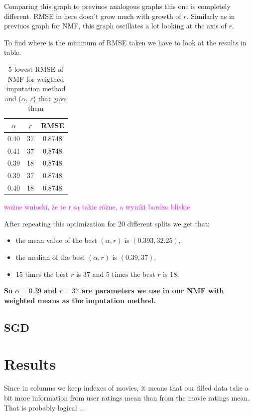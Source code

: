 \documentclass[11pt]{amsart}
\newcommand{\tami}[1]{{\textcolor{magenta}{#1}}}
\begin{document}
Comparing this graph to previuos analogous graphs this one is completely different.
RMSE in here doen't grow much with growth of $r$.
Similarly as in previuos graph for NMF, this graph oscillates a lot looking at the axis of $r$.

To find where is the minimum of RMSE taken we have to look at the results in table.

\begin{table}[H]
\begin{tabular}{cc|c}
$\alpha$ &  $r$ &     RMSE \\
\hline
       0.40 & 37 & 0.8748 \\
       0.41 & 37 & 0.8748 \\
       0.39 & 18 & 0.8748 \\
       0.39 & 37 & 0.8748 \\
       0.40 & 18 & 0.8748 \\
\end{tabular}
\caption{5 lowest RMSE of NMF for weigthed imputation method and ($\alpha$, $r$) that gave them}
\end{table}

\tami{ważne wnioski, że te r są takie różne, a wyniki bardzo bliskie}

After repeating this optimization for 20 different splits we get that:
\begin{itemize}
    \item the mean value of the best $(\alpha, r)$ is $(0.393, 32.25)$,
    \item the median of the best $(\alpha, r)$ is $(0.39, 37)$,
    \item 15 times the best $r$ is 37 and 5 times the best $r$ is 18.
\end{itemize}
\textbf{So $\alpha = 0.39$ and $r=37$ are parameters we use in our NMF with weighted means as the imputation method.}




\subsection*{SGD}




\section{}

\section{Results}

Since in columns we keep indexes of movies, it means that our filled data take a bit more information from user ratings mean than from the movie ratings mean.
That is probably logical \tami{...}
\end{document}
